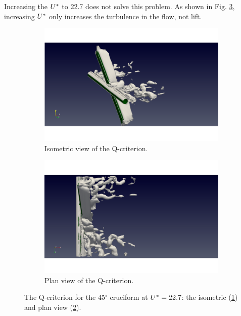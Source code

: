 \documentclass[oneside]{utmthesis}
\begin{document}
\noindent Increasing the $U^{*}$ to 22.7 does not solve this problem. As shown in Fig. \ref{fig:qCrit045U10}, increasing $U^{*}$ only increases the turbulence in the flow, not lift.

\begin{figure}[H]
  \centering
  \begin{subfigure}[h]{0.48\textwidth}
    \includegraphics[width=\textwidth,trim={1.5cm 0 3cm 0},clip]{figs/qIso045U10}
    \caption{Isometric view of the Q-criterion.}
    \label{fig:qIso045U10}
  \end{subfigure}
  \hfill
  \begin{subfigure}[h]{0.48\textwidth}
    \includegraphics[width=\textwidth,trim={1.5cm 0 3cm 0},clip]{figs/qTop045U10}
    \caption{Plan view of the Q-criterion.}
    \label{fig:qTop045U10}
  \end{subfigure}

  \caption{The Q-criterion for the 45$^{\circ}$ cruciform at $U^{*} = 22.7$: the isometric (\ref{fig:qIso045U10}) and plan view (\ref{fig:qTop045U10}).} \label{fig:qCrit045U10}
\end{figure}
\end{document}
